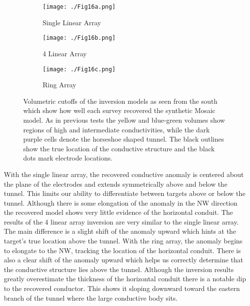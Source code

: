 \documentclass[preprint,authoryear,12pt]{elsarticle}
\begin{document}
\begin{figure}[htp]{}
   \begin{center}
      \begin{subfigure}{0.48\linewidth}
         \label{fig:SynthMosaic_Horseshoe_SingleLinear_South}
         \texttt{[image: ./Fig16a.png]}
         \caption{Single Linear Array}
      \end{subfigure}
      \hspace{-0.7cm}
      \qquad
      \begin{subfigure}{0.48\linewidth}
         \label{fig:SynthMosaic_Horseshoe_4Linear_South}
         \texttt{[image: ./Fig16b.png]}
         \caption{4 Linear Array}
      \end{subfigure}
      \vspace{0.2cm}

      \begin{subfigure}{0.48\linewidth}
         \label{fig:SynthMosaic_Horseshoe_Ring_South}
         \texttt{[image: ./Fig16c.png]}
         \caption{Ring Array}
      \end{subfigure}
      \vspace{0.2cm}
   \end{center}
\vspace{-0.4cm}
\caption{Volumetric cutoffs of the inversion models as seen from the south which show how well each survey recovered the synthetic Mosaic model. As in previous tests the yellow and blue-green volumes show regions of high and intermediate conductivities, while the dark purple cells denote the horseshoe shaped tunnel. The black outlines show the true location of the conductive structure and the black dots mark electrode locations.}
\label{fig:Horseshoe_SynthMosaic2_Isosurfaces_South}
\end{figure}


With the single linear array, the recovered conductive anomaly is centered about the plane of the electrodes and extends symmetrically above and below the tunnel. This limits our ability to differentiate between targets above or below the tunnel. Although there is some elongation of the anomaly in the NW direction the recovered model shows very little evidence of the horizontal conduit. The results of the 4 linear array inversion are very similar to the single linear array. The main difference is a slight shift of the anomaly upward which hints at the target's true location above the tunnel. With the ring array, the anomaly begins to elongate to the NW, tracking the location of the horizontal conduit. There is also a clear shift of the anomaly upward which helps us correctly determine that the conductive structure lies above the tunnel. Although the inversion results greatly overestimate the thickness of the horizontal conduit there is a notable dip to the recovered conductor. This shows it sloping downward toward the eastern branch of the tunnel where the large conductive body sits.
\end{document}
